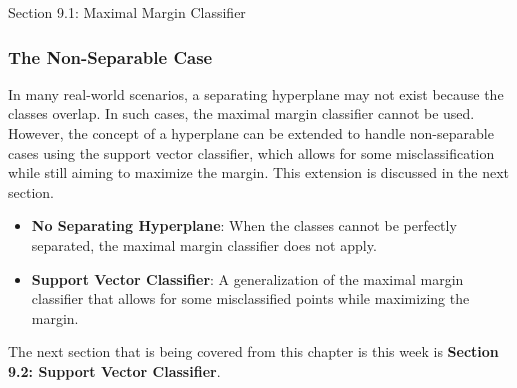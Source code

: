 \begin{notes}{Section 9.1: Maximal Margin Classifier}
    \subsubsection*{The Non-Separable Case}
    
    In many real-world scenarios, a separating hyperplane may not exist because the classes overlap. In such cases, the maximal margin classifier cannot be used. However, the concept of a hyperplane can 
    be extended to handle non-separable cases using the support vector classifier, which allows for some misclassification while still aiming to maximize the margin. This extension is discussed in the next section.
    
    \begin{highlight}
        \begin{itemize}
            \item \textbf{No Separating Hyperplane}: When the classes cannot be perfectly separated, the maximal margin classifier does not apply.
            \item \textbf{Support Vector Classifier}: A generalization of the maximal margin classifier that allows for some misclassified points while maximizing the margin.
        \end{itemize}
    \end{highlight}
\end{notes}

The next section that is being covered from this chapter is this week is \textbf{Section 9.2: Support Vector Classifier}.

